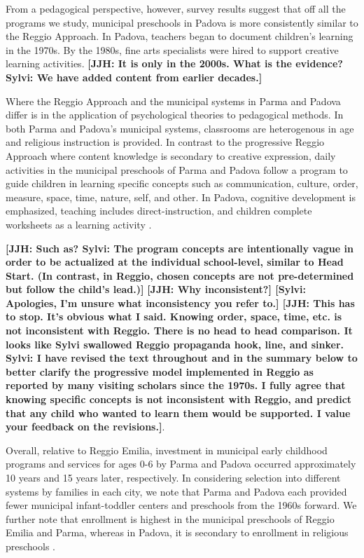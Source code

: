 From a pedagogical perspective, however, survey results suggest that off all the programs we study, municipal preschools in Padova is more consistently similar to the Reggio Approach. In Padova, teachers began to document children's learning in the 1970s. By the 1980s, fine arts specialists were hired to support creative learning activities. 
\textbf{[JJH: It is only in the 2000s. What is the evidence? Sylvi: We have added content from earlier decades.]} 

Where the Reggio Approach and the municipal systems in Parma and Padova differ is in the application of psychological theories to pedagogical methods. In both Parma and Padova's municipal systems, classrooms are heterogenous in age and religious instruction is provided. In contrast to the progressive Reggio Approach where content knowledge is secondary to creative expression, daily activities in the municipal preschools of Parma and Padova follow a program to guide children in learning specific concepts such as communication, culture, order, measure, space, time, nature, self, and other. In Padova, cognitive development is emphasized, teaching includes direct-instruction, and children complete worksheets as a learning activity \citep{CEHD_2016_Historical-Analysis}. 

\textbf{[JJH: Such as? Sylvi: The program concepts are intentionally vague in order to be actualized at the individual school-level, similar to Head Start. (In contrast, in Reggio, chosen concepts are not pre-determined but follow the child's lead.)]} \textbf{[JJH: Why inconsistent?] [Sylvi: Apologies, I'm unsure what inconsistency you refer to.] [JJH: This has to stop. It's obvious what I said. Knowing order, space, time, etc. is not inconsistent with Reggio. There is no head to head comparison. It looks like Sylvi swallowed Reggio propaganda hook, line, and sinker. Sylvi: I have revised the text throughout and in the summary below to better clarify the progressive model implemented in Reggio as reported by many visiting scholars since the 1970s. I fully agree that knowing specific concepts is not inconsistent with Reggio, and predict that any child who wanted to learn them would be supported. I value your feedback on the revisions.]}.

Overall, relative to Reggio Emilia, investment in municipal early childhood programs and services for ages 0-6 by Parma and Padova occurred approximately 10 years and 15 years later, respectively. In considering selection into different systems by families in each city, we note that Parma and Padova each provided fewer municipal infant-toddler centers and preschools from the 1960s forward. We further note that enrollment is highest in the municipal preschools of Reggio Emilia and Parma, whereas in Padova, it is secondary to enrollment in religious preschools \citep{Padova-Admin-Data_1964-2011,Reggio-Admin-data_1966-2006,Reggio-Annual-Journals_1994-2011}. 


